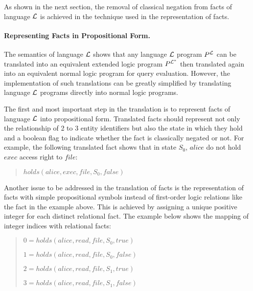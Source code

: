 \documentclass[10pt, twocolumn]{article}
\begin{document}
          As shown in the next section, the removal of classical negation from
          facts of language $\cal{L}$ is achieved in the technique used in the
          representation of facts.

        \paragraph{Representing Facts in Propositional Form.}

          The semantics of language ${\cal L}$ shows that any language
          ${\cal L}$ program $P^{\cal L}$ can be translated into an equivalent
          extended logic program $P^{\cal{L^{*}}}$ then translated again into
          an equivalent normal logic program for query evaluation. However, the
          implementation of such translations can be greatly simplified by
          translating language ${\cal L}$ programs directly into normal logic
          programs.

          The first and most important step in the translation is to represent
          facts of language ${\cal L}$ into propositional form. Translated
          facts should represent not only the relationship of 2 to 3 entity
          identifiers but also the state in which they hold and a boolean flag
          to indicate whether the fact is classically negated or not. For
          example, the following translated fact shows that in state $S_{0}$,
          $alice$ do not hold $exec$ access right to $file$:

          \begin{quote}
            $holds(alice, exec, file, S_{0}, false)$
          \end{quote}

          Another issue to be addressed in the translation of facts is the
          representation of facts with simple propositional symbols instead
          of first-order logic relations like the fact in the example above.
          This is achieved by assigning a unique positive integer for each
          distinct relational fact. The example below shows the mapping of
          integer indices with relational facts:

          \begin{quote}
            $0 = holds(alice, read, file, S_{0}, true)$

            $1 = holds(alice, read, file, S_{0}, false)$

            $2 = holds(alice, read, file, S_{1}, true)$

            $3 = holds(alice, read, file, S_{1}, false)$
          \end{quote}
\end{document}
